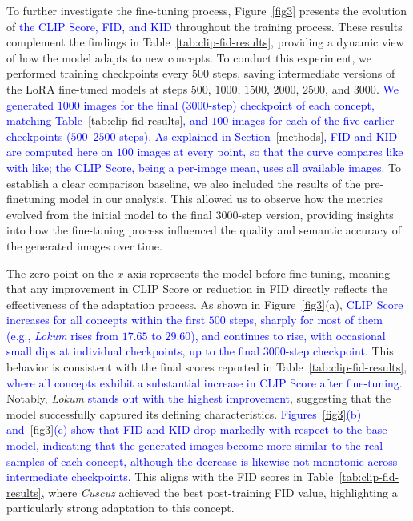 \documentclass[pdflatex,sn-mathphys-num]{sn-jnl}%
\theoremstyle{thmstyleone}%
\theoremstyle{thmstyletwo}%
\theoremstyle{thmstylethree}%
\begin{document}
To further investigate the fine-tuning process, Figure~\ref{fig3} presents the evolution of \textcolor{blue}{the CLIP Score, FID, and KID} throughout the training process. These results complement the findings in Table~\ref{tab:clip-fid-results}, providing a dynamic view of how the model adapts to new concepts. To conduct this experiment, we performed training checkpoints every $500$ steps, saving intermediate versions of the LoRA fine-tuned models at steps $500$, $1000$, $1500$, $2000$, $2500$, and $3000$. \textcolor{blue}{We generated $1000$ images for the final ($3000$-step) checkpoint of each concept, matching Table~\ref{tab:clip-fid-results}, and $100$ images for each of the five earlier checkpoints ($500$--$2500$ steps). As explained in Section~\ref{methods}, FID and KID are computed here on $100$ images at every point, so that the curve compares like with like; the CLIP Score, being a per-image mean, uses all available images.} To establish a clear comparison baseline, we also included the results of the pre-finetuning model in our analysis. This allowed us to observe how the metrics evolved from the initial model to the final $3000$-step version, providing insights into how the fine-tuning process influenced the quality and semantic accuracy of the generated images over time.

The zero point on the $x$-axis represents the model before fine-tuning, meaning that any improvement in CLIP Score or reduction in FID directly reflects the effectiveness of the adaptation process. As shown in Figure~\ref{fig3}(a), \textcolor{blue}{CLIP Score increases for all concepts within the first $500$ steps, sharply for most of them (e.g., \textit{Lokum} rises from $17.65$ to $29.60$), and continues to rise, with occasional small dips at individual checkpoints, up to the final $3000$-step checkpoint.} This behavior is consistent with the final scores reported in Table~\ref{tab:clip-fid-results}, \textcolor{blue}{where all concepts exhibit a substantial increase in CLIP Score after fine-tuning.} Notably, \textit{Lokum} \textcolor{blue}{stands out with the highest improvement}, suggesting that the model successfully captured its defining characteristics. \textcolor{blue}{Figures~\ref{fig3}(b) and~\ref{fig3}(c) show that FID and KID drop markedly with respect to the base model, indicating that the generated images become more similar to the real samples of each concept, although the decrease is likewise not monotonic across intermediate checkpoints.} This aligns with the FID scores in Table~\ref{tab:clip-fid-results}, where \textit{Cuscuz} achieved the best post-training FID value, highlighting a particularly strong adaptation to this concept.
\end{document}
